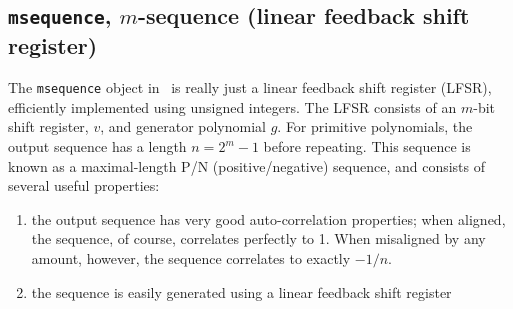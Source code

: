 \subsection{{\tt msequence}, $m$-sequence (linear feedback shift register)}
\label{module:sequence:msequence}
The {\tt msequence} object in \liquid\ is really just a linear feedback shift
register (LFSR), efficiently implemented using unsigned integers.
The LFSR consists of an $m$-bit shift register, $v$, and generator polynomial
$g$.
For primitive polynomials, the output sequence has a length $n=2^m-1$ before
repeating.
This sequence is known as a maximal-length P/N (positive/negative) sequence,
and consists of several useful properties:
\begin{enumerate}
\item the output sequence has very good auto-correlation properties; when
      aligned, the sequence, of course, correlates perfectly to 1.
      When misaligned by any amount, however, the sequence correlates to
      exactly $-1/n$.
\item the sequence is easily generated using a linear feedback shift register
\end{enumerate}

